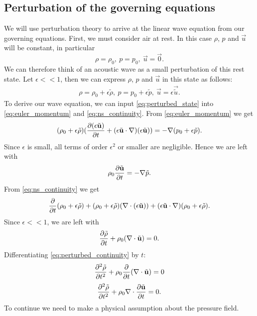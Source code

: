 \subsection{Perturbation of the governing equations}\label{ss:perturbation}
We will use perturbation theory to arrive at the linear wave equation from our governing equations.
%
First, we must consider air at rest. In this case $\rho$, $p$ and $\vec{u}$ will be constant, in particular
    \[ \rho = \rho_0,~ p = p_0,~ \vec{u} = \vec{0}.
    \]
%
We can therefore think of an acoustic wave as a small perturbation of this rest state. Let $\epsilon << 1$, then we can express $\rho$, $p$ and $\vec{u}$ in this state as follows:
    \begin{gather}\label{eq:perturbed_state}
    \rho = \rho_0 +\epsilon \tilde{\rho},~
    p = p_0 + \epsilon \tilde{p},~
    \vec{u} = \epsilon \vec{\tilde{u}}.
    \end{gather}
%
To derive our wave equation, we can input \eqref{eq:perturbed_state} into \eqref{eq:euler_momentum} and \eqref{eq:ns_continuity}.
%
From \eqref{eq:euler_momentum} we get
    \begin{equation*}
        (\rho_0 + \epsilon\tilde{\rho})
        (
        \frac{\partial (\epsilon \tilde{\mathbf{u}})}{\partial t} + (\epsilon\tilde{\mathbf{u}} \cdot \nabla)(\epsilon\tilde{\mathbf{u}})
        )
        = - \nabla (p_0 + \epsilon\tilde{p}).
    \end{equation*}
%
Since $\epsilon$ is small, all terms of order $\epsilon^2$ or smaller are negligible. Hence we are left with
    \begin{equation}\label{eq:perturbed_momentum}
        \rho_0 \frac{\partial \tilde{\mathbf{u}}}{\partial t} = - \nabla \tilde{p}.
    \end{equation}
%
From \eqref{eq:ns_continuity} we get
    \begin{equation*}
        \frac{\partial }{\partial t}(\rho_0 + \epsilon\tilde{\rho}) + (\rho_0 + \epsilon\tilde{\rho})(\nabla \cdot (\epsilon\tilde{\mathbf{u}})) + (\epsilon\tilde{\mathbf{u}} \cdot \nabla) (\rho_0 + \epsilon\tilde{\rho}).
    \end{equation*}
%
Since $\epsilon<<1$, we are left with
    \begin{equation}\label{eq:perturbed_continuity}
        \frac{\partial \tilde{\rho}}{\partial t} + \rho_0 (\nabla \cdot \tilde{\mathbf{u}}) = 0.
    \end{equation}
%
Differentiating \eqref{eq:perturbed_continuity} by $t$:
    \begin{equation*}
        \frac{\partial ^2 \tilde{\rho}}{\partial t^2} + \rho_0 \frac{\partial }{\partial t}(\nabla \cdot \tilde{\mathbf{u}}) = 0
    \end{equation*}
    \begin{equation}
        \frac{\partial ^2 \tilde{\rho}}{\partial t^2}
        + \rho_0 \nabla \cdot \frac{\partial \tilde{\mathbf{u}}}{\partial t} = 0.
    \end{equation}
%
To continue we need to make a physical assumption about the pressure field.
%
